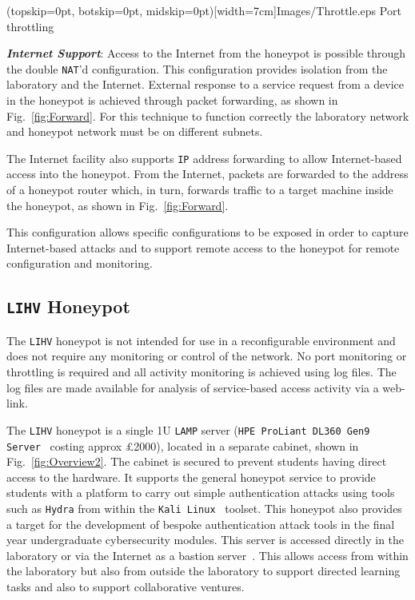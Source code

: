 \documentclass{ieeeaccess}
\begin{document}
\Figure[t!](topskip=0pt, botskip=0pt, midskip=0pt)[width=7cm]{Images/Throttle.eps}
{Port throttling\label{fig:throttling}}


\noindent\textit{\textbf{Internet Support}}:
Access to the Internet from the honeypot is possible through the double
\texttt{NAT}'d configuration. This configuration provides isolation from the
laboratory and the Internet. External response to a service request from a
device in the honeypot is achieved through packet forwarding, as shown in
Fig.~\ref{fig:Forward}. For this technique to function correctly the laboratory
network and honeypot network must be on different subnets.

The Internet facility also supports \texttt{IP} address forwarding to allow
Internet-based access into the honeypot. From the Internet, packets are
forwarded to the address of a honeypot router which, in turn, forwards traffic
to a target machine inside the honeypot, as shown in Fig.~\ref{fig:Forward}.

This configuration allows specific configurations to be exposed in order to
capture Internet-based attacks and to support remote access to the honeypot for
remote configuration and monitoring.

\subsection{\texttt{LIHV} Honeypot}

The \texttt{LIHV} honeypot is not intended for use in a reconfigurable
environment and does not require any monitoring or control of the network. No
port monitoring or throttling is required and all activity monitoring is
achieved using log files. The log files are made available 
for analysis of service-based access activity via a web-link.

The \texttt{LIHV} honeypot is a single 1U \texttt{LAMP} server (\texttt{HPE ProLiant DL360 Gen9 Server}~\cite{HPE:17} costing approx \pounds2000), located in a
separate cabinet, shown in Fig.~\ref{fig:Overview2}. The cabinet is secured to
prevent students having direct access to the hardware. It supports the general
honeypot service to provide students with a platform to carry out simple
authentication attacks using tools such as \texttt{Hydra} from within the
\texttt{Kali Linux}~\cite{OS:17} toolset. This honeypot also provides a target
for the development of bespoke authentication attack tools in the final year
undergraduate cybersecurity modules.  This server is accessed directly in the
laboratory or via the Internet as a bastion server~\cite{MB:05}. This allows
access from within the laboratory but also from outside the laboratory to
support directed learning tasks and also to support collaborative ventures.
\end{document}
